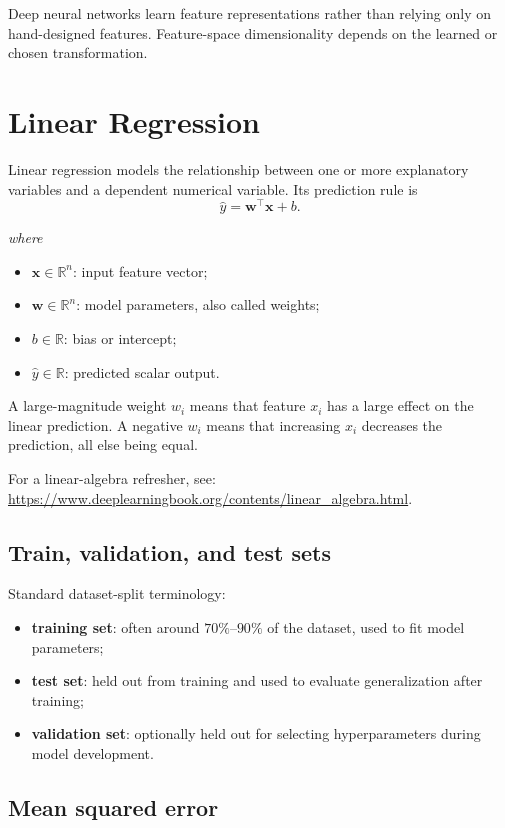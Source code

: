 \documentclass[11pt,a4paper]{report}
\newcommand{\vect}[1]{\bm{#1}}
\newcommand{\R}{\mathbb{R}}
\newcommand{\wherelegend}{\par\smallskip\textit{where}\vspace{-0.3em}}
\begin{document}
Deep neural networks learn feature representations rather than relying only on hand-designed features. Feature-space dimensionality depends on the learned or chosen transformation.

\section{Linear Regression}

Linear regression models the relationship between one or more explanatory variables and a dependent numerical variable. Its prediction rule is
\begin{equation}
  \hat{y} = \vect{w}^{\top}\vect{x} + b.
  \label{eq:linear-regression}
\end{equation}
\wherelegend
\begin{itemize}
  \item $\vect{x}\in\R^n$: input feature vector;
  \item $\vect{w}\in\R^n$: model parameters, also called weights;
  \item $b\in\R$: bias or intercept;
  \item $\hat{y}\in\R$: predicted scalar output.
\end{itemize}

A large-magnitude weight $w_i$ means that feature $x_i$ has a large effect on the linear prediction. A negative $w_i$ means that increasing $x_i$ decreases the prediction, all else being equal.

For a linear-algebra refresher, see: \url{https://www.deeplearningbook.org/contents/linear_algebra.html}.

\subsection{Train, validation, and test sets}

Standard dataset-split terminology:
\begin{itemize}
  \item \textbf{training set}: often around $70\%$--$90\%$ of the dataset, used to fit model parameters;
  \item \textbf{test set}: held out from training and used to evaluate generalization after training;
  \item \textbf{validation set}: optionally held out for selecting hyperparameters during model development.
\end{itemize}

\subsection{Mean squared error}
\end{document}
